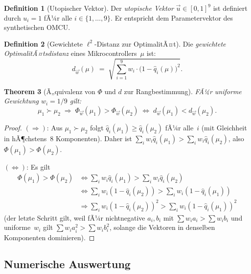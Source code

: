 ﻿\documentclass[12pt, a4paper]{article}
\theoremstyle{plain}
\newtheorem{theorem}{Theorem}[section]
\theoremstyle{definition}
\newtheorem{definition}[theorem]{Definition}
\theoremstyle{remark}
\newcommand{\omcu}{\textsc{OMCU}}
\begin{document}
\begin{definition}[Utopischer Vektor]
\label{def:utopisch}
  Der \emph{utopische Vektor} $\vec{u} \in [0,1]^9$ ist definiert durch
  $u_i = 1$ fÃ¼r alle $i \in \{1,\ldots,9\}$.
  Er entspricht dem Parametervektor des synthetischen \omcu{}.
\end{definition}

\begin{definition}[Gewichtete $\ell^2$-Distanz zur OptimalitÃ¤t]
\label{def:distanz}
  Die \emph{gewichtete OptimalitÃ¤tsdistanz} eines Mikrocontrollers~$\mu$ ist:
  \[
    d_{\vec{w}}(\mu) \;=\;
    \sqrt{\sum_{i=1}^{9} w_i \cdot \bigl(1 - \hat{q}_i(\mu)\bigr)^2}.
  \]
\end{definition}

\begin{theorem}[Ã„quivalenz von $\Phi$ und $d$ zur Rangbestimmung]
\label{thm:aquivalenz}
  FÃ¼r uniforme Gewichtung $w_i = 1/9$ gilt:
  \[
    \mu_1 \succ \mu_2 \;\Longrightarrow\;
    \Phi_{\vec{w}}(\mu_1) > \Phi_{\vec{w}}(\mu_2) \;\Longleftrightarrow\;
    d_{\vec{w}}(\mu_1) < d_{\vec{w}}(\mu_2).
  \]
\end{theorem}

\begin{proof}
  $(\Rightarrow)$: Aus $\mu_1 \succ \mu_2$ folgt $\hat{q}_i(\mu_1) \ge
  \hat{q}_i(\mu_2)$ fÃ¼r alle~$i$ (mit Gleichheit in hÃ¶chstens~8 Komponenten).
  Daher ist
  $\sum_i w_i \hat{q}_i(\mu_1) > \sum_i w_i \hat{q}_i(\mu_2)$,
  also $\Phi(\mu_1) > \Phi(\mu_2)$.

  $(\Longleftrightarrow)$: Es gilt
  \begin{align*}
    \Phi(\mu_1) > \Phi(\mu_2)
    &\Leftrightarrow \sum_i w_i \hat{q}_i(\mu_1) > \sum_i w_i \hat{q}_i(\mu_2) \\
    &\Leftrightarrow \sum_i w_i (1-\hat{q}_i(\mu_2)) > \sum_i w_i (1-\hat{q}_i(\mu_1)) \\
    &\Rightarrow \sum_i w_i (1-\hat{q}_i(\mu_2))^2 > \sum_i w_i (1-\hat{q}_i(\mu_1))^2
  \end{align*}
  (der letzte Schritt gilt, weil fÃ¼r nichtnegative $a_i, b_i$ mit
  $\sum w_i a_i > \sum w_i b_i$ und uniforme~$w_i$ gilt
  $\sum w_i a_i^2 > \sum w_i b_i^2$, solange die Vektoren in
  denselben Komponenten dominieren).
 
\end{proof}

\subsection{Numerische Auswertung}
\end{document}
